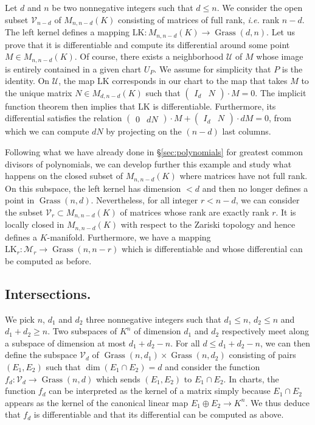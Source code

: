 \documentclass{sig-alternate}
\DeclareMathOperator{\Grass}{Grass}
\begin{document}
{Let $d$ and $n$ be two nonnegative integers such that $d \leq n$.
We consider the open subset $\mathcal V_{n-d}$ of $M_{n,n-d}(K)$ 
consisting of matrices of full rank, \emph{i.e.} rank $n-d$. The left 
kernel defines a mapping $\text{LK} : M_{n,n-d}(K) \to \Grass(d,n)$. Let 
us prove that it is differentiable and compute its differential around 
some point $M \in M_{n,n-d}(K)$. Of course, there exists a neighborhood 
$\mathcal U$ of $M$ whose image is entirely contained in a given chart 
$U_P$. We assume for simplicity that $P$ is the identity. On $\mathcal 
U$, the map $\text{LK}$ corresponds in our chart to the map that 
takes $M$ to the unique matrix $N \in M_{d, n-d}(K)$ such that 
$\begin{pmatrix} I_d & N \end{pmatrix} \cdot M = 0$. The implicit 
function theorem then implies that $\text{LK}$ is differentiable. 
Furthermore, its differential satisfies the relation
$\begin{pmatrix} 0 & dN \end{pmatrix} \cdot M +
\begin{pmatrix} I_d & N \end{pmatrix} \cdot dM = 0$,
from which we can compute $dN$ by projecting on the $(n-d)$ last
columns.

Following what we have already done in \S \ref{sec:polynomials} for 
greatest common divisors of polynomials, we can develop further this 
example and study what happens on the closed subset of $M_{n,n-d}(K)$ 
where matrices have not full rank. On this subspace, the left kernel has 
dimension $< d$ and then no longer defines a point in $\Grass(n,d)$. 
Nevertheless, for all integer $r < n-d$, we can consider the subset 
$\mathcal V_r \subset M_{n,n-d}(K)$ of matrices whose rank are exactly 
rank $r$. It is locally closed in $M_{n,n-d}(K)$ with respect to the 
Zariski topology and hence defines a $K$-manifold. Furthermore, we have a 
mapping $\text{LK}_r : \mathcal M_r \to \Grass(n,n-r)$ which is 
differentiable and whose differential can be computed as before.

\subsection*{Intersections.}

We pick $n$, $d_1$ and 
$d_2$ three nonnegative integers such that $d_1 \leq n$, $d_2 \leq n$ 
and $d_1 + d_2 \geq n$. Two subspaces of $K^n$ of dimension $d_1$ and 
$d_2$ respectively meet along a subspace of dimension at most $d_1 + d_2 
- n$. For all $d \leq d_1 + d_2 -n$, we can then define the subspace 
$\mathcal V_d$ of $\Grass(n,d_1) \times \Grass(n,d_2)$ consisting of 
pairs $(E_1, E_2)$ such that $\dim (E_1 \cap E_2) = d$ and consider the 
function $f_d : \mathcal V_d \to \Grass(n, d)$ which sends $(E_1, E_2)$ 
to $E_1 \cap E_2$. In charts, the function $f_d$ can be interpreted as
the kernel of a matrix simply because $E_1 \cap E_2$ appears as the
kernel of the canonical linear map $E_1 \oplus E_2 \to K^n$. We thus deduce
that $f_d$ is differentiable and that its differential can be
computed as above.

}
\end{document}
